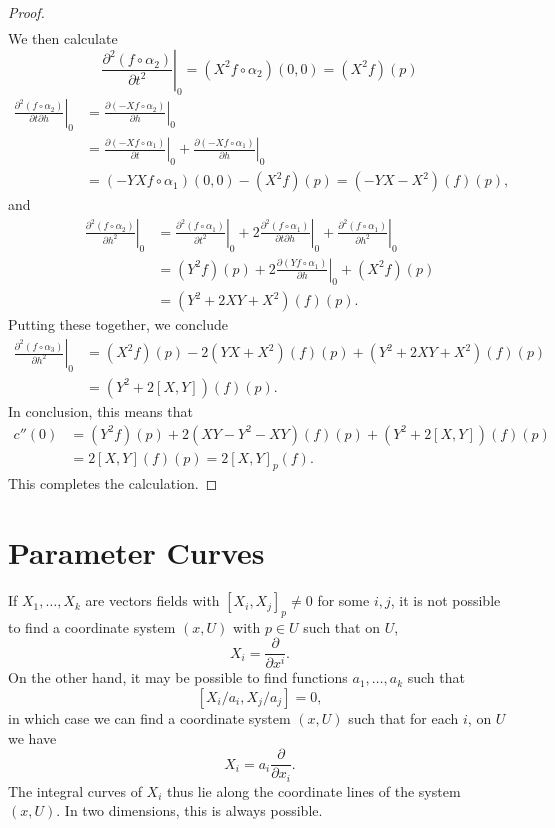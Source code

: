 \begin{proof}
\begin{align*}
    \end{align*}
    We then calculate
    \[ \left. \frac{\partial^2 (f \circ \alpha_2)}{\partial t^2} \right|_0 = (X^2 f \circ \alpha_2)(0,0) = (X^2 f)(p) \]
    \begin{align*}
        \left. \frac{\partial^2 (f \circ \alpha_2)}{\partial t \partial h} \right|_0 &= \left. \frac{\partial (-Xf \circ \alpha_2)}{\partial h} \right|_0\\
        &= \left. \frac{\partial (-Xf \circ \alpha_1)}{\partial t} \right|_0 + \left. \frac{\partial (-Xf \circ \alpha_1)}{\partial h} \right|_0\\
        &= (-YXf \circ \alpha_1)(0,0) - (X^2 f)(p) = (-YX - X^2)(f)(p),
    \end{align*}
    and
    \begin{align*}
        \left. \frac{\partial^2 (f \circ \alpha_2)}{\partial h^2} \right|_0 &= \left. \frac{\partial^2 (f \circ \alpha_1)}{\partial t^2} \right|_0 + 2 \left. \frac{\partial^2 (f \circ \alpha_1)}{\partial t \partial h} \right|_0 + \left. \frac{\partial^2 (f \circ \alpha_1)}{\partial h^2} \right|_0\\
        &= (Y^2 f)(p) + 2 \left. \frac{\partial (Yf \circ \alpha_1)}{\partial h} \right|_0 + (X^2 f)(p)\\
        &= (Y^2 + 2XY + X^2)(f)(p).
    \end{align*}
    Putting these together, we conclude
    \begin{align*}
        \left. \frac{\partial^2 (f \circ \alpha_3)}{\partial h^2} \right|_0 &= (X^2 f)(p) - 2(YX + X^2)(f)(p) + (Y^2 + 2XY + X^2)(f)(p)\\
        &= (Y^2 + 2[X,Y])(f)(p).
    \end{align*}
    In conclusion, this means that
    \begin{align*}
        c''(0) &= (Y^2f)(p) + 2(XY - Y^2 - XY)(f)(p) + (Y^2 + 2[X,Y])(f)(p)\\
        &= 2[X,Y](f)(p) = 2[X,Y]_p(f).
    \end{align*}
    This completes the calculation.
\end{proof}

\section{Parameter Curves}

If $X_1, \dots, X_k$ are vectors fields with $[X_i,X_j]_p \neq 0$ for some $i,j$, it is not possible to find a coordinate system $(x,U)$ with $p \in U$ such that on $U$,
%
\[ X_i = \frac{\partial}{\partial x^i}. \]
%
On the other hand, it may be possible to find functions $a_1, \dots, a_k$ such that
%
\[ [X_i/a_i, X_j/a_j] = 0, \]
%
in which case we can find a coordinate system $(x,U)$ such that for each $i$, on $U$ we have
%
\[ X_i = a_i \frac{\partial}{\partial x_i}. \]
%
The integral curves of $X_i$ thus lie along the coordinate lines of the system $(x,U)$. In two dimensions, this is always possible.

